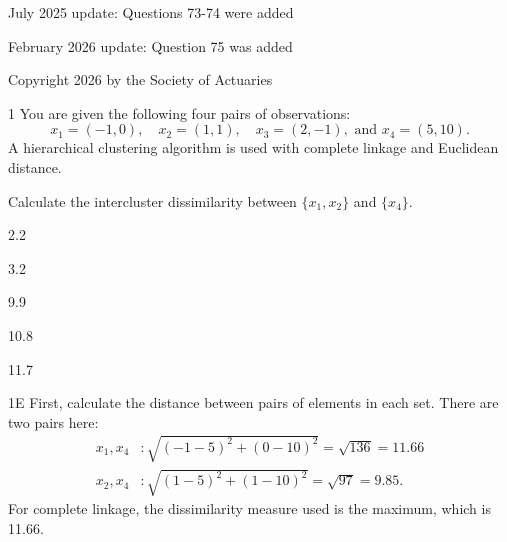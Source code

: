July 2025 update: Questions 73-74 were added

February 2026 update: Question 75 was added

Copyright 2026 by the Society of Actuaries


\begin{question}{1}
You are given the following four pairs of observations:
\[ x_1 = (-1,0),\quad x_2 = (1,1),\quad x_3 = (2,-1),\text{ and } x_4 = (5,10). \]
A hierarchical clustering algorithm is used with complete linkage and Euclidean distance.

Calculate the intercluster dissimilarity between $\{x_1, x_2\}$ and $\{x_4\}$.

\begin{choices}
\item 2.2
\item 3.2
\item 9.9
\item 10.8
\item 11.7
\end{choices}
\end{question}
\begin{solution}{1}{E}
First, calculate the distance between pairs of elements in each set. There are two pairs here:
\begin{align*}
x_1, x_4 &: \sqrt{(-1-5)^2 + (0-10)^2} = \sqrt{136} = 11.66 \\
x_2, x_4 &: \sqrt{(1-5)^2 + (1-10)^2} = \sqrt{97} = 9.85.
\end{align*}
For complete linkage, the dissimilarity measure used is the maximum, which is 11.66.
\end{solution}

